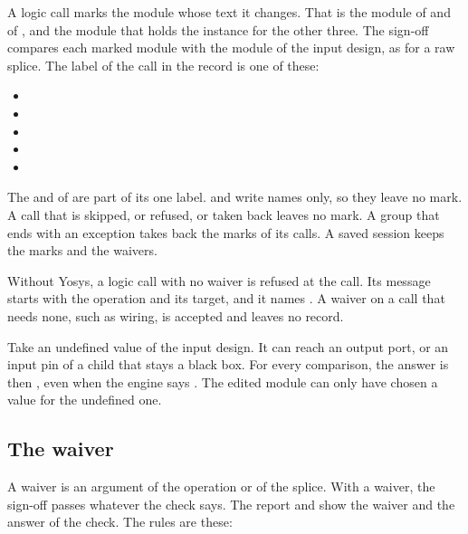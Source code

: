 A logic call marks the module whose text it changes. That is the module of
 and of , and the module that holds
the instance for the other three. The
sign-off compares each marked module with the module of the input design, as for a raw
splice. The label of the call in the record is one of these:

\begin{itemize}
\item {}
\item {}
\item {}
\item {}
\item {}
\end{itemize}

The  and  of  are part of its
one label.  and  write names only, so
they leave no mark. A call that is skipped, or refused, or taken back leaves no mark. A
group that ends with an exception takes back the marks of its calls. A saved session keeps
the marks and the waivers.

Without Yosys, a logic call with no waiver is refused at the call. Its message starts with
the operation and its target, and it names . A waiver on a call that
needs none, such as wiring, is accepted and leaves no record.

Take an undefined value of the input design. It can reach an output port, or an input pin
of a child that stays a black box. For every comparison, the answer is then , even when the engine says . The edited module can
only have chosen a value for the undefined one.

\subsection*{The waiver}

A waiver is an argument of the operation or of the splice. With a waiver, the sign-off
passes whatever the check says. The report and  show the waiver and the
answer of the check. The rules are these:

